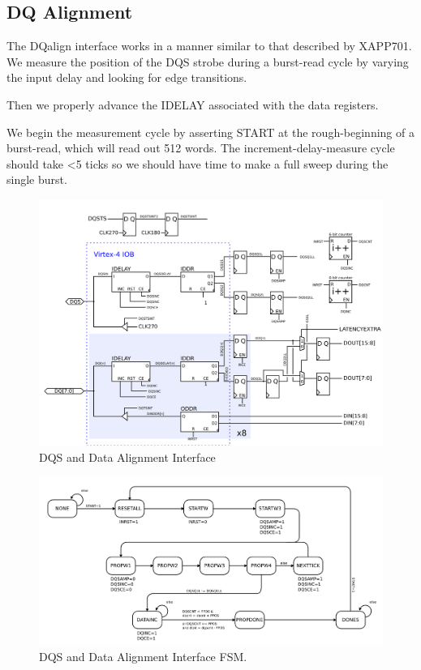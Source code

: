 \subsection{DQ Alignment}

The DQalign interface works in a manner similar to that described by
XAPP701. We measure the position of the DQS strobe during a burst-read
cycle by varying the input delay and looking for edge transitions.

Then we properly advance the IDELAY associated with the data registers. 

We begin the measurement cycle by asserting START at the
rough-beginning of a burst-read, which will read out 512 words. The
increment-delay-measure cycle should take <5 ticks so we should have
time to make a full sweep during the single burst.

\begin{figure}
\begin{centering}
\includegraphics[scale=0.8]{dqalign.svg}
\end{centering}
\caption{DQS and Data Alignment Interface }
\label{dqalign}
\end{figure}

\begin{figure}
\begin{centering}
\includegraphics[scale=0.8]{dqalign.fsm.svg}
\end{centering}
\caption{DQS and Data Alignment Interface FSM.}
\label{dqalign}
\end{figure}

